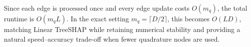 \documentclass{article}
\newcommand{\cD}{\mathcal{D}}
\newcommand{\cS}{\mathcal{S}}
\begin{document}
Since each edge is processed once and every edge update costs $O(m_q)$, the total runtime is $O(m_qL)$. In the exact setting $m_q=\lceil D/2\rceil$, this becomes $O(LD)$, matching Linear TreeSHAP while retaining numerical stability and providing a natural speed--accuracy trade-off when fewer quadrature nodes are used.





\end{document}
